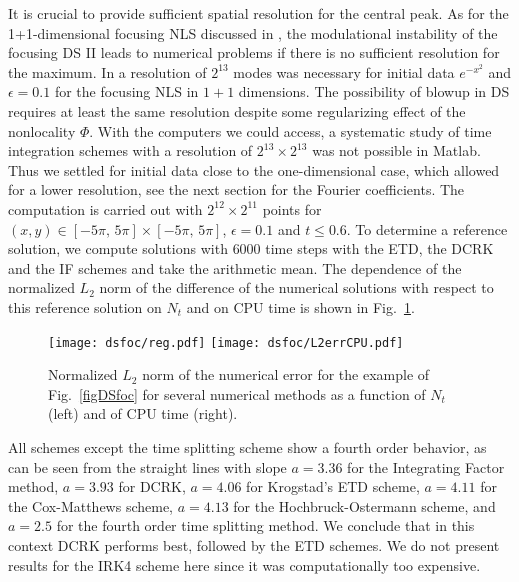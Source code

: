 \documentclass[final]{siamltex}
\begin{document}
It is crucial to provide sufficient 
spatial resolution for the central peak. As for the 
1+1-dimensional focusing NLS discussed in \cite{ckkdvnls}, the 
modulational instability of the focusing DS II leads to numerical 
problems if there is no sufficient resolution for the maximum.
In \cite{ckkdvnls} a 
resolution of $2^{13}$ modes was necessary for initial data 
$e^{-x^{2}}$ and $\epsilon=0.1$ for the focusing NLS in 
$1+1$ dimensions.  The possibility of blowup in DS requires at 
least the same resolution despite some regularizing effect of the 
nonlocality $\Phi$. With the computers we could access, a systematic 
study of time integration schemes with a resolution of $2^{13}\times 
2^{13}$ was not possible in Matlab. Thus we settled for initial data close to 
the one-dimensional case, which allowed for a lower resolution, see 
the next section for the Fourier coefficients.
The computation is carried out with $2^{12}\times2^{11}$ points
for $(x, y)\in[-5\pi,\,5\pi]\times[-5\pi,\,5\pi]$, $\epsilon=0.1$
and $t\leq0.6$. To determine a reference solution, we compute solutions
with $6000$ time steps with the ETD, the DCRK and the IF schemes
and take the arithmetic mean. The dependence of the normalized $L_{2}$
norm of the difference of the numerical solutions with respect to
this reference solution on 
$N_{t}$ and on CPU time is shown in Fig.~\ref{figDSfocsmallreg}.
\begin{figure}[htb!]
  \centering
 \texttt{[image: dsfoc/reg.pdf]}
 \texttt{[image: dsfoc/L2errCPU.pdf]}
 \caption{Normalized $L_{2}$ norm of the numerical error for the 
 example of Fig.~\ref{figDSfoc} for several numerical
methods as a function of $N_{t}$ (left) and of CPU time (right).}
   \label{figDSfocsmallreg}
\end{figure}
All schemes except the time splitting scheme show a fourth order 
 behavior, as can be seen from the straight lines with slope
 $a=3.36$ for the Integrating Factor method, $a=3.93$ for
 DCRK, 
$a=4.06$ for Krogstad's ETD scheme, $a=4.11$ for the Cox-Matthews scheme, $a=4.13$ 
for the Hochbruck-Ostermann scheme, and $a=2.5$ for the fourth order
time splitting method. 
We conclude that in this context  DCRK performs 
best, followed by the ETD schemes. We do not present results for the 
IRK4 scheme here since it was computationally too expensive. 
\end{document}
